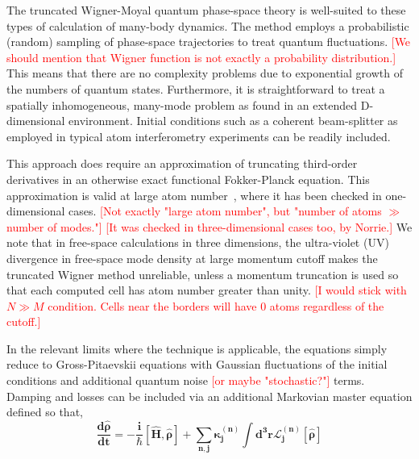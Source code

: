 \documentclass[aps,prl,twocolumn,showpacs,amsmath,amssymb,superscriptaddress]{revtex4-1}
\newcommand{\remark}[1]{\textcolor{red}{{[}#1{]}}}
\begin{document}
The truncated Wigner-Moyal quantum phase-space theory is well-suited
to these types of calculation of many-body dynamics.
The method employs a probabilistic (random) sampling of phase-space trajectories
to treat quantum fluctuations.
	\remark{We should mention that Wigner function is not exactly a probability distribution.}
This means that there are no complexity problems due to exponential growth
of the numbers of quantum states.
Furthermore, it is straightforward to treat a spatially inhomogeneous,
many-mode problem as found in an extended D-dimensional environment.
Initial conditions such as a coherent beam-splitter
as employed in typical atom interferometry experiments can be readily included.

This approach does require an approximation of truncating third-order derivatives
in an otherwise exact functional Fokker-Planck equation.
This approximation is valid at large atom number~\cite{Sinatra2002,Norrie2006},
where it has been checked in one-dimensional cases.
	\remark{Not exactly "large atom number", but "number of atoms $\gg$ number of modes."}
	\remark{It was checked in three-dimensional cases too, by Norrie.}
We note that in free-space calculations in three dimensions,
the ultra-violet (UV) divergence in free-space mode density at large momentum cutoff
makes the truncated Wigner method unreliable,
unless a momentum truncation is used so that each computed cell has atom number greater than unity.
	\remark{I would stick with $N \gg M$ condition.
	Cells near the borders will have 0 atoms regardless of the cutoff.}

In the relevant limits where the technique is applicable,
the equations simply reduce to Gross-Pitaevskii equations with Gaussian fluctuations
of the initial conditions and additional quantum noise \remark{or maybe "stochastic?"} terms.
Damping and losses can be included via an additional Markovian master equation defined so that,
\begin{equation}
\bm{
	\frac{d\hat{\rho}}{dt} = -\frac{i}{\hbar} \left[ \hat{H}, \hat{\rho} \right] +
	\sum_{n,\mathbf{j}} \kappa_{\mathbf{j}}^{(n)}
	\int d^{3}\mathbf{r}\mathcal{L}_{\mathbf{j}}^{(n)} \left[ \hat{\rho} \right]
}
\end{equation}
\end{document}
